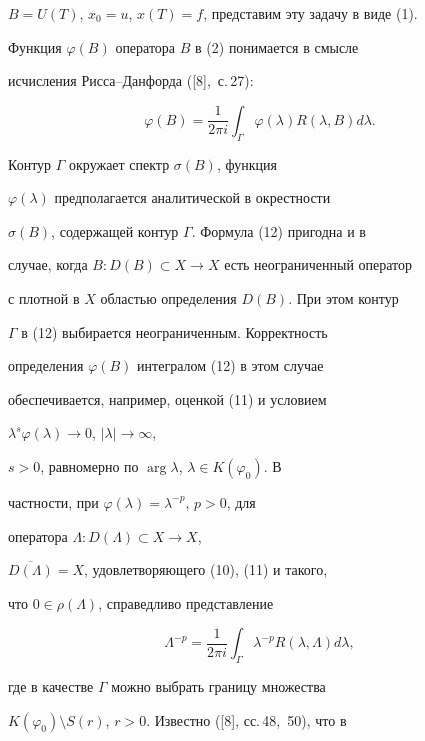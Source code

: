 $B=U(T)$, $x_0=u$, $x(T)=f$, представим эту задачу в виде (1).








Функция $\varphi(B)$ оператора $B$ в (2) понимается в смысле


исчисления Рисса--Данфорда ([8],~с.\,27):


\begin{equation}


\varphi (B) = \frac{1}{2\pi i} \int_{\Gamma}


\varphi(\lambda) R(\lambda, B) d\lambda.


\end{equation}


Контур $\Gamma$ окружает спектр $\sigma(B)$, функция


$\varphi(\lambda)$ предполагается аналитической в окрестности


$\sigma(B)$, содержащей контур $\Gamma$. Формула (12) пригодна и в


случае, когда $B:D(B)\subset X\to X$ есть неограниченный оператор


с плотной в $X$ областью определения $D(B)$. При этом контур


$\Gamma$ в (12) выбирается неограниченным. Корректность


определения $\varphi(B)$ интегралом (12) в этом случае


обеспечивается, например, оценкой (11) и условием


${\lambda}^s\varphi(\lambda)\to 0$, $|\lambda|\to\infty$,


$s>0$, равномерно по $\arg\lambda$, $\lambda\in K(\varphi_0)$. В


частности, при $\varphi(\lambda)={\lambda}^{-p}$, $p>0$, для


оператора $\Lambda: D(\Lambda)\subset X\to X$,


$\overline{D(\Lambda)}=X$, удовлетворяющего (10), (11) и такого,


что $0\in\rho(\Lambda)$, справедливо представление


$$


\Lambda^{-p} = \frac{1}{2\pi i} \int_{\Gamma}


{\lambda}^{-p} R(\lambda, \Lambda) d\lambda,


$$


где в качестве $\Gamma$ можно выбрать границу множества


$K(\varphi_0)\setminus S(r)$, $r>0$. Известно ([8], сс.\,48,~50), что в


